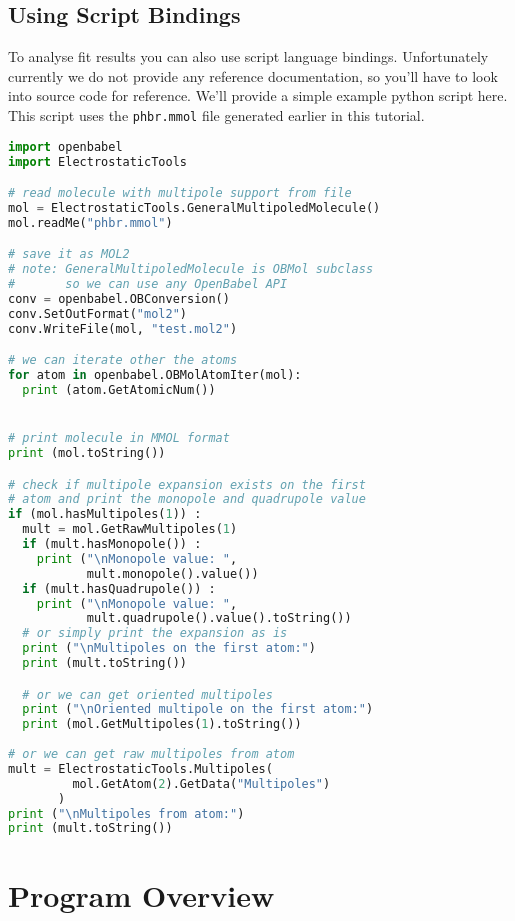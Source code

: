 \documentclass[10pt,a4paper]{article}
\begin{document}
\subsection{Using Script Bindings}
To analyse fit results you can also use script language bindings. Unfortunately currently 
we do not provide any reference documentation, so you'll have to look into source code for 
reference. We'll provide a simple example python script here. This script uses the 
\lstinline{phbr.mmol} file generated earlier in this tutorial.
\begin{lstlisting}[language=Python]
import openbabel
import ElectrostaticTools

# read molecule with multipole support from file
mol = ElectrostaticTools.GeneralMultipoledMolecule()
mol.readMe("phbr.mmol")

# save it as MOL2 
# note: GeneralMultipoledMolecule is OBMol subclass
#       so we can use any OpenBabel API
conv = openbabel.OBConversion()
conv.SetOutFormat("mol2")
conv.WriteFile(mol, "test.mol2")

# we can iterate other the atoms
for atom in openbabel.OBMolAtomIter(mol):
  print (atom.GetAtomicNum())


# print molecule in MMOL format
print (mol.toString())

# check if multipole expansion exists on the first 
# atom and print the monopole and quadrupole value
if (mol.hasMultipoles(1)) :
  mult = mol.GetRawMultipoles(1)
  if (mult.hasMonopole()) :
    print ("\nMonopole value: ", 
           mult.monopole().value())
  if (mult.hasQuadrupole()) :
    print ("\nMonopole value: ", 
           mult.quadrupole().value().toString())
  # or simply print the expansion as is
  print ("\nMultipoles on the first atom:")
  print (mult.toString())

  # or we can get oriented multipoles
  print ("\nOriented multipole on the first atom:")
  print (mol.GetMultipoles(1).toString())
  
# or we can get raw multipoles from atom
mult = ElectrostaticTools.Multipoles(
         mol.GetAtom(2).GetData("Multipoles")
       )
print ("\nMultipoles from atom:")
print (mult.toString())
\end{lstlisting}
  
\newpage
\section{Program Overview}
\end{document}
